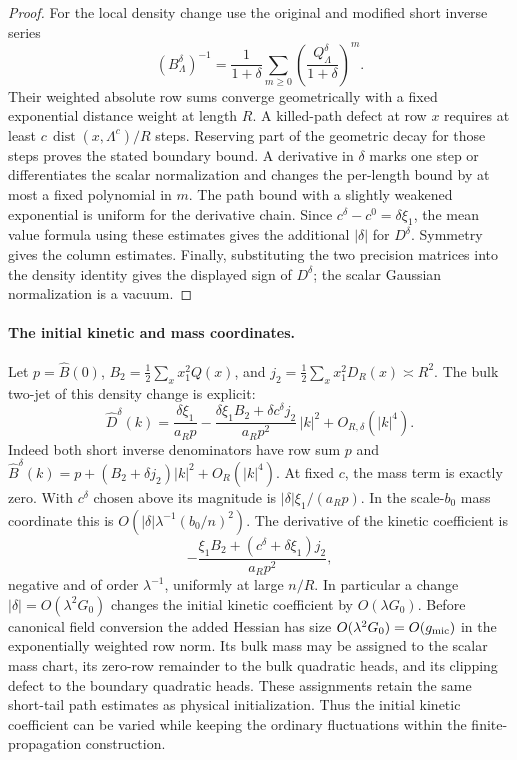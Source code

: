 \documentclass[11pt]{article}
\theoremstyle{definition}
\newcommand{\dist}{\operatorname{dist}}
\begin{document}
\begin{proof}
For the local density change use the original and modified
short inverse series
\begin{equation}
 (B^\delta_\Lambda)^{-1}
 =\frac1{1+\delta}\sum_{m\ge0}
                  \left(\frac{Q^\delta_\Lambda}{1+\delta}\right)^m .
\end{equation}
Their weighted absolute row sums converge geometrically
with a fixed exponential distance weight at length \(R\).
A killed-path defect at row \(x\) requires at least
\(c\,\dist(x,\Lambda^c)/R\) steps. Reserving part of the
geometric decay for those steps proves the stated boundary
bound. A derivative in \(\delta\) marks one step or
differentiates the scalar normalization and changes the
per-length bound by at most a fixed polynomial in \(m\).
The path bound with a slightly weakened exponential
is uniform for the derivative chain. Since \(c^\delta-c^0
=\delta\xi_1\), the mean value formula using these estimates
gives the additional \(|\delta|\) for \(D^\delta\).
Symmetry gives the column estimates. Finally,
substituting the two precision matrices into the density
identity gives the displayed sign of \(D^\delta\);
the scalar Gaussian normalization is a vacuum.
\end{proof}

\paragraph{The initial kinetic and mass coordinates.}
Let \(p=\widehat B(0)\),
\(B_2=\tfrac12\sum_xx_1^2Q(x)\),
and \(j_2=\tfrac12\sum_xx_1^2D_R(x)\asymp R^2\).
The bulk two-jet of this density change is explicit:
\begin{equation}
 \widehat D^\delta(k)
 = \frac{\delta\xi_1}{a_R p}
 - \frac{\delta\xi_1 B_2+\delta c^\delta j_2}
           {a_R p^2}\,|k|^2 +O_{R,\delta}(|k|^4).
\end{equation}
Indeed both short inverse denominators have row sum \(p\)
and \(\widehat B^\delta(k)=p+(B_2+\delta j_2)|k|^2
+O_R(|k|^4)\). At fixed \(c\), the mass term is exactly
zero. With \(c^\delta\) chosen above its magnitude is
\(|\delta|\xi_1/(a_Rp)\). In the scale-\(b_0\)
mass coordinate this is
\(O(|\delta|\lambda^{-1}(b_0/n)^2)\).
The derivative of the kinetic coefficient is
\begin{equation}
 -\frac{\xi_1 B_2+(c^\delta+\delta\xi_1)j_2}{a_R p^2},
\end{equation}
negative and of order \(\lambda^{-1}\), uniformly at
large \(n/R\). In particular a change
\(|\delta|=O(\lambda^2G_0)\) changes the initial kinetic
coefficient by \(O(\lambda G_0)\). Before canonical
field conversion the added Hessian has size
\(O(\lambda^2G_0)=O(g_{\rm mic})\) in the exponentially
weighted row norm. Its bulk mass may be assigned to
the scalar mass chart, its zero-row remainder to the
bulk quadratic heads, and its clipping defect to the
boundary quadratic heads. These assignments retain the
same short-tail path estimates as physical initialization.
Thus the initial kinetic coefficient can be varied while keeping
the ordinary fluctuations within the finite-propagation
construction.
\end{document}
